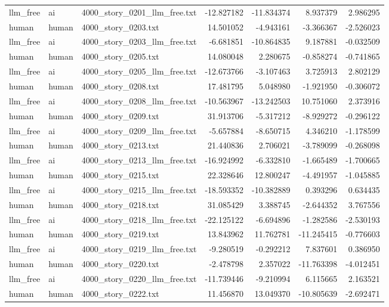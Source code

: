 \begin{longtable}{lllrrrr}
llm\_free & ai & 4000\_story\_0201\_llm\_free.txt & -12.827182 & -11.834374 & 8.937379 & 2.986295 \\
human & human & 4000\_story\_0203.txt & 14.501052 & -4.943161 & -3.366367 & -2.526023 \\
llm\_free & ai & 4000\_story\_0203\_llm\_free.txt & -6.681851 & -10.864835 & 9.187881 & -0.032509 \\
human & human & 4000\_story\_0205.txt & 14.080048 & 2.280675 & -0.858274 & -0.741865 \\
llm\_free & ai & 4000\_story\_0205\_llm\_free.txt & -12.673766 & -3.107463 & 3.725913 & 2.802129 \\
human & human & 4000\_story\_0208.txt & 17.481795 & 5.048980 & -1.921950 & -0.306072 \\
llm\_free & ai & 4000\_story\_0208\_llm\_free.txt & -10.563967 & -13.242503 & 10.751060 & 2.373916 \\
human & human & 4000\_story\_0209.txt & 31.913706 & -5.317212 & -8.929272 & -0.296122 \\
llm\_free & ai & 4000\_story\_0209\_llm\_free.txt & -5.657884 & -8.650715 & 4.346210 & -1.178599 \\
human & human & 4000\_story\_0213.txt & 21.440836 & 2.706021 & -3.789099 & -0.268098 \\
llm\_free & ai & 4000\_story\_0213\_llm\_free.txt & -16.924992 & -6.332810 & -1.665489 & -1.700665 \\
human & human & 4000\_story\_0215.txt & 22.328646 & 12.800247 & -4.491957 & -1.045885 \\
llm\_free & ai & 4000\_story\_0215\_llm\_free.txt & -18.593352 & -10.382889 & 0.393296 & 0.634435 \\
human & human & 4000\_story\_0218.txt & 31.085429 & 3.388745 & -2.644352 & 3.767556 \\
llm\_free & ai & 4000\_story\_0218\_llm\_free.txt & -22.125122 & -6.694896 & -1.282586 & -2.530193 \\
human & human & 4000\_story\_0219.txt & 13.843962 & 11.762781 & -11.245415 & -0.776603 \\
llm\_free & ai & 4000\_story\_0219\_llm\_free.txt & -9.280519 & -0.292212 & 7.837601 & 0.386950 \\
human & human & 4000\_story\_0220.txt & -2.478798 & 2.357022 & -11.763398 & -4.012451 \\
llm\_free & ai & 4000\_story\_0220\_llm\_free.txt & -11.739446 & -9.210994 & 6.115665 & 2.163521 \\
human & human & 4000\_story\_0222.txt & 11.456870 & 13.049370 & -10.805639 & -2.692471 \\

\end{longtable}
